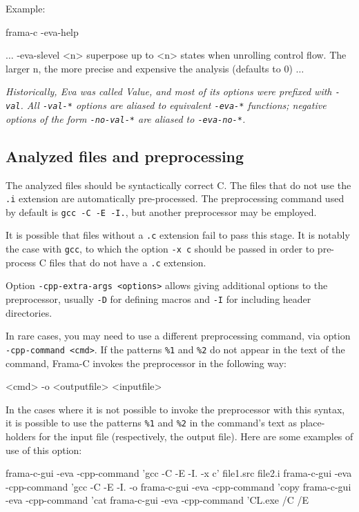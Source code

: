 \documentclass[web]{frama-c-book}
\makeatletter
\newenvironment{important}%
{\hspace{5pt plus \linewidth minus \marginparsep}%
 \begin{lrbox}{\@tempboxa}%
   \begin{minipage}{\linewidth - 2\fboxsep}\itshape}
{\end{minipage}\end{lrbox}\colorbox{gris}{\usebox{\@tempboxa}}}
\newcommand{\Eva}{\textsf{Eva}}
\makeatother
\begin{document}
Example:
\begin{shell}
frama-c -eva-help
\end{shell}
\begin{logs}
$\dots$
-eva-slevel <n>     superpose up to <n> states when unrolling control flow.
                    The larger n, the more precise and expensive the analysis
                    (defaults to 0)
$\dots$
\end{logs}

\begin{important}
  Historically, \Eva{} was called Value, and most of its options
  were prefixed with \lstinline|-val|. All \lstinline|-val-*| options
  are aliased to equivalent \lstinline|-eva-*| functions; negative options of
  the form \lstinline|-no-val-*| are aliased to \lstinline|-eva-no-*|.
\end{important}

\subsection{Analyzed files and preprocessing}\label{sec:analyz-files-prepr}

The analyzed files should be syntactically correct C. The files
that do not use the {\tt .i} extension are automatically
pre-processed. The preprocessing command used by default is
\lstinline|gcc -C -E -I.|, but another preprocessor may be employed.

It is possible that files without a {\tt .c} extension
fail to pass this stage. It is notably the case with \lstinline|gcc|,
to which the option \lstinline|-x c| should be passed in order to pre-process
C files that do not have a \lstinline|.c| extension.
\goodbreak

Option \lstinline|-cpp-extra-args <options>| allows giving additional options
to the preprocessor, usually \verb|-D| for defining macros and \verb|-I| for
including header directories.

In rare cases, you may need to use a different preprocessing command, via
option \lstinline|-cpp-command <cmd>|.
If the patterns \lstinline|%1| and \lstinline|%2| do not appear 
in the text of the
command, Frama-C invokes the preprocessor in the following way:
\begin{shell}
<cmd> -o <outputfile> <inputfile>
\end{shell}

In the cases where it is not possible to invoke the preprocessor with
this syntax, it is possible to use the 
patterns \lstinline|%1| and \lstinline|%2|
in the command's text as place-holders for the input file (respectively,
the output file). Here are some examples of use of this option:
\begin{shell}
frama-c-gui -eva -cpp-command 'gcc -C -E -I. -x c' file1.src file2.i
frama-c-gui -eva -cpp-command 'gcc -C -E -I. -o %
frama-c-gui -eva -cpp-command 'copy %
frama-c-gui -eva -cpp-command 'cat %
frama-c-gui -eva -cpp-command 'CL.exe /C /E %
\end{shell}
\end{document}
